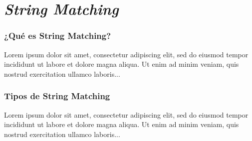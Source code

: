 \part*{\textit{String Matching}}%

\section*{¿Qué es String Matching?}

Lorem ipsum dolor sit amet, consectetur adipiscing elit, sed do 
eiusmod tempor incididunt ut labore et dolore magna aliqua. Ut 
enim ad minim veniam, quis nostrud exercitation ullamco laboris...

\section*{Tipos de String Matching}

Lorem ipsum dolor sit amet, consectetur adipiscing elit, sed do 
eiusmod tempor incididunt ut labore et dolore magna aliqua. Ut 
enim ad minim veniam, quis nostrud exercitation ullamco laboris...